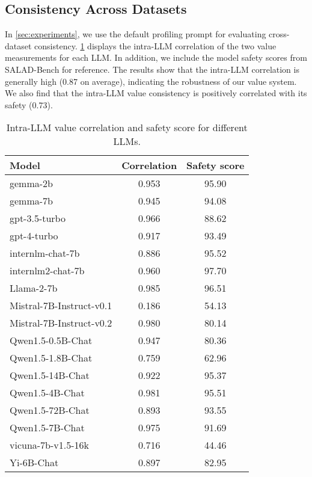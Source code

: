 \subsection{Consistency Across Datasets}\label{app:consistency}

In \cref{sec:experiments}, we use the default profiling prompt for evaluating cross-dataset consistency. \cref{tab:intra_llm} displays the intra-LLM correlation of the two value measurements for each LLM. In addition, we include the model safety scores from SALAD-Bench \cite{li2024salad} for reference. The results show that the intra-LLM correlation is generally high (0.87 on average), indicating the robustness of our value system. We also find that the intra-LLM value consistency is positively correlated with its safety (0.73).


\begin{table}[ht]
    \centering
    \begin{tabular}{l|c|c}
    \toprule
    Model & Correlation & Safety score \\
    \midrule
    gemma-2b & 0.953 & 95.90 \\
    gemma-7b & 0.945 & 94.08 \\
    gpt-3.5-turbo & 0.966 & 88.62 \\
    gpt-4-turbo & 0.917 & 93.49 \\
    internlm-chat-7b & 0.886 & 95.52 \\
    internlm2-chat-7b & 0.960 & 97.70 \\
    Llama-2-7b & 0.985 & 96.51 \\
    Mistral-7B-Instruct-v0.1 & 0.186 & 54.13 \\
    Mistral-7B-Instruct-v0.2 & 0.980 & 80.14 \\
    Qwen1.5-0.5B-Chat & 0.947 & 80.36 \\
    Qwen1.5-1.8B-Chat & 0.759 & 62.96 \\
    Qwen1.5-14B-Chat & 0.922 & 95.37 \\
    Qwen1.5-4B-Chat & 0.981 & 95.51 \\
    Qwen1.5-72B-Chat & 0.893 & 93.55 \\
    Qwen1.5-7B-Chat & 0.975 & 91.69 \\
    vicuna-7b-v1.5-16k & 0.716 & 44.46 \\
    Yi-6B-Chat & 0.897 & 82.95 \\
    \bottomrule
    \end{tabular}
    \caption{Intra-LLM value correlation and safety score for different LLMs.}
    \label{tab:intra_llm}
\end{table}


